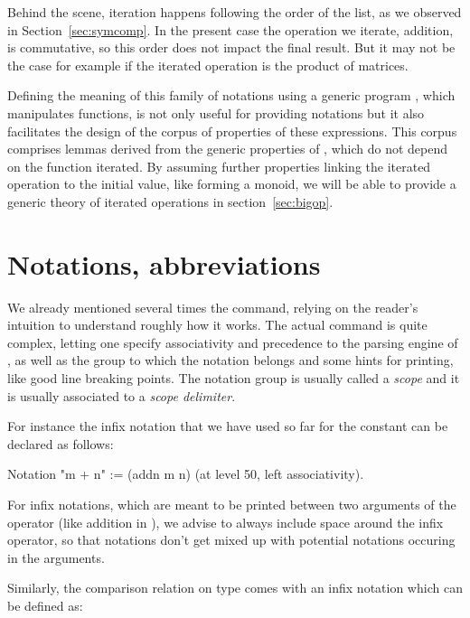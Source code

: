 Behind the scene, iteration happens following the order of the list,
as we observed in Section~\ref{sec:symcomp}.
In the present case the operation we iterate, addition, is
commutative, so this order does not impact the final result. But it
may not be the case for example if the iterated operation
is the product of matrices.

Defining the meaning of this family of notations using a generic
program , which manipulates functions, is not only useful for
providing notations but it also facilitates the design of the
corpus of properties of these expressions. This corpus comprises
lemmas derived from the generic properties of , which do not
depend on the function iterated. By assuming further properties
linking the iterated operation to the initial value, like forming a
monoid, we will be able to provide a generic theory of iterated
operations in section~\ref{sec:bigop}.

\section{Notations, abbreviations}\label{sec:notabrev}

We already mentioned several times the  command, relying on the
reader's intuition to understand roughly how it works.  The actual command is
quite complex, letting one specify associativity and precedence to the
parsing engine of \Coq{}, as well as the group to which the notation
belongs and some hints for printing, like good
line breaking points.  The notation group is usually called a {\em scope} and it
is usually associated to a {\em scope delimiter}.

For instance the infix notation that we have used so far for the
constant  can be declared as follows:

\begin{coq}{}{}
Notation "m + n" := (addn m n) (at level 50, left associativity).
\end{coq}

For infix notations, which are meant to be printed between two arguments
of the operator (like addition in ), we advise to always include
space around the infix operator, so that notations don't get mixed up with
potential notations occuring in the arguments.


Similarly, the comparison relation  on type  comes with
an infix notation \C{<=} which can be defined as:

